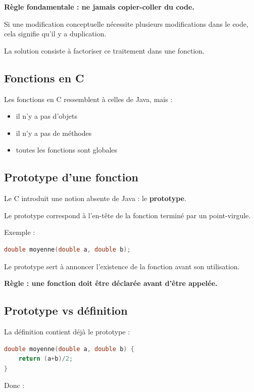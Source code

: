 \textbf{Règle fondamentale : ne jamais copier-coller du code.}

Si une modification conceptuelle nécessite plusieurs modifications dans le code,
cela signifie qu’il y a duplication.

La solution consiste à factoriser ce traitement dans une fonction.

\subsection{Fonctions en C}

Les fonctions en C ressemblent à celles de Java, mais :

\begin{itemize}
    \item il n’y a pas d’objets
    \item il n’y a pas de méthodes
    \item toutes les fonctions sont globales
\end{itemize}

\subsection{Prototype d’une fonction}

Le C introduit une notion absente de Java : le \textbf{prototype}.

Le prototype correspond à l’en-tête de la fonction terminé par un point-virgule.

Exemple :

\begin{lstlisting}[language=C]
double moyenne(double a, double b);
\end{lstlisting}

Le prototype sert à annoncer l’existence de la fonction avant son utilisation.

\textbf{Règle : une fonction doit être déclarée avant d’être appelée.}

\subsection{Prototype vs définition}

La définition contient déjà le prototype :

\begin{lstlisting}[language=C]
double moyenne(double a, double b) {
    return (a+b)/2;
}
\end{lstlisting}

Donc :

